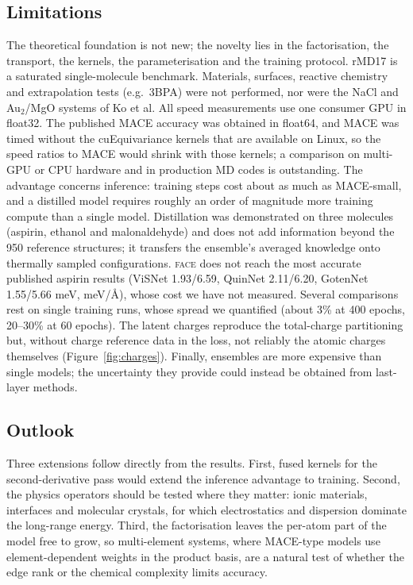 \documentclass[journal=jctcce,manuscript=article,layout=traditional]{achemso}
\newcommand{\FACE}{\textup{\textsc{face}}}
\begin{document}
\subsection{Limitations}
The theoretical foundation is not new; the novelty lies in the factorisation, the transport, the kernels, the
parameterisation and the training protocol. rMD17 is a saturated single-molecule benchmark. Materials, surfaces,
reactive chemistry and extrapolation tests (e.g.\ 3BPA\cite{kovacs2021}) were not performed, nor were the NaCl and
Au$_2$/MgO systems of Ko et al. All speed measurements use one consumer GPU in float32. The published MACE accuracy
was obtained in float64, and MACE was timed without the cuEquivariance kernels that are available on Linux, so the
speed ratios to MACE would shrink with those kernels; a comparison on multi-GPU or CPU hardware and in production
MD codes is outstanding. The advantage concerns inference: training steps cost about as much as MACE-small, and a
distilled model requires roughly an order of magnitude more training compute than a single model. Distillation was
demonstrated on three molecules (aspirin, ethanol and malonaldehyde) and does not add information beyond the 950 reference structures; it
transfers the ensemble's averaged knowledge onto thermally sampled configurations. \FACE{} does not reach the most
accurate published aspirin results (ViSNet 1.93/6.59, QuinNet 2.11/6.20, GotenNet 1.55/5.66 meV, meV/\AA), whose
cost we have not measured. Several comparisons rest on single training runs, whose spread we quantified (about 3\%
at 400 epochs, 20--30\% at 60 epochs). The latent charges reproduce the total-charge partitioning but, without charge
reference data in the loss, not reliably the atomic charges themselves (Figure~\ref{fig:charges}). Finally,
ensembles are more expensive than single models; the uncertainty they
provide could instead be obtained from last-layer methods\cite{bigi2024llpr}.

\subsection{Outlook}
Three extensions follow directly from the results. First, fused kernels for the second-derivative pass would extend
the inference advantage to training. Second, the physics operators should be tested where they matter: ionic
materials, interfaces and molecular crystals, for which electrostatics and dispersion dominate the long-range
energy. Third, the factorisation leaves the per-atom part of the model free to grow, so multi-element systems, where
MACE-type models use element-dependent weights in the product basis, are a natural test of whether the edge rank or the
chemical complexity limits accuracy.
\end{document}
